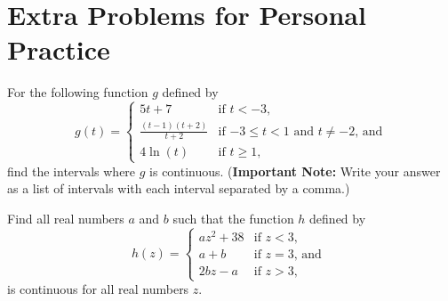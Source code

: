 \documentclass[handout,nooutcomes]{ximera}
\begin{document}
\section{Extra Problems for Personal Practice}
\label{section:extra-problems}
\begin{problem}
  \label{problem:finding-intervals-of-continuity}
  For the following function $g$ defined by
  \[
    g(t) =
    \begin{cases}
      5t + 7 & \mbox{if $t < -3$,}\\
      \displaystyle\frac{(t-1)(t+2)}{t+2} & \mbox{if $-3 \leq t < 1$ and $t \neq -2$, and}\\
      4 \ln(t) & \mbox{if $t \geq 1$,}
    \end{cases}
  \]
  find the intervals where $g$ is continuous.
  (\textbf{Important Note:} Write your answer as a list of intervals with each interval separated by a comma.)
\end{problem}

\begin{problem}
  \label{problem:makeing-a-function-cont}
  Find all real numbers $a$ and $b$ such that the function $h$ defined by
  \[
    h(z) =
    \begin{cases}
      az^2 + 38 &  \mbox{if $z < 3$,}\\
      a + b & \mbox{if $z = 3$, and }\\
      2bz - a &	\mbox{if $z > 3$,}
    \end{cases}
  \]
  is continuous for all real numbers $z$.
\end{problem}
\end{document}
